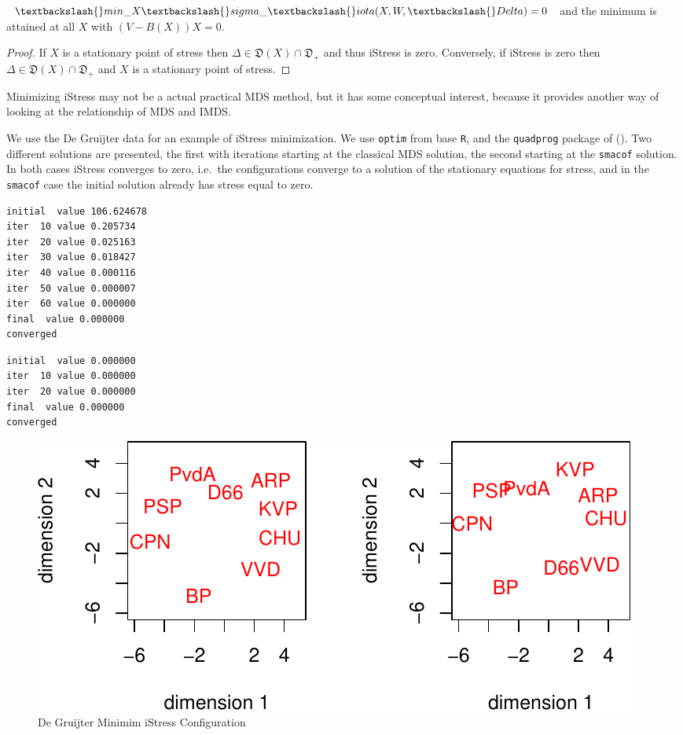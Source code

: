 \documentclass[
  12pt,
  letterpaper,
  DIV=11,
  numbers=noendperiod]{scrreprt}
\newenvironment{Shaded}{\begin{snugshade}}{\end{snugshade}}
\newcommand{\NormalTok}[1]{\textcolor[rgb]{0.00,0.23,0.31}{#1}}
\theoremstyle{remark}
\begin{document}
\begin{Shaded}
\begin{Highlighting}[]
\NormalTok{$\textbackslash{}min\_X\textbackslash{}sigma\_\textbackslash{}iota(X,W,\textbackslash{}Delta)=0$ and the minimum is attained at all $X$ with $(V{-}B(X))X=0$.}
\end{Highlighting}
\end{Shaded}

\begin{proof}
If \(X\) is a stationary point of stress then
\(\Delta\in\mathfrak{D}(X)\cap\mathfrak{D}_+\) and thus iStress is zero.
Conversely, if iStress is zero then
\(\Delta\in\mathfrak{D}(X)\cap\mathfrak{D}_+\) and \(X\) is a stationary
point of stress.
\end{proof}

Minimizing iStress may not be a actual practical MDS method, but it has
some conceptual interest, because it provides another way of looking at
the relationship of MDS and IMDS.

We use the De Gruijter data for an example of iStress minimization. We
use \texttt{optim} from base \texttt{R}, and the \texttt{quadprog}
package of
().
Two different solutions are presented, the first with iterations
starting at the classical MDS solution, the second starting at the
\texttt{smacof} solution. In both cases iStress converges to zero,
i.e.~the configurations converge to a solution of the stationary
equations for stress, and in the \texttt{smacof} case the initial
solution already has stress equal to zero.

\begin{verbatim}
initial  value 106.624678 
iter  10 value 0.205734
iter  20 value 0.025163
iter  30 value 0.018427
iter  40 value 0.000116
iter  50 value 0.000007
iter  60 value 0.000000
final  value 0.000000 
converged
\end{verbatim}

\begin{verbatim}
initial  value 0.000000 
iter  10 value 0.000000
iter  20 value 0.000000
final  value 0.000000 
converged
\end{verbatim}

\begin{figure}[H]

{\centering \includegraphics{inverse_files/figure-pdf/istressplot-1.pdf}

}

\caption{De Gruijter Minimim iStress Configuration}

\end{figure}%
\end{document}
